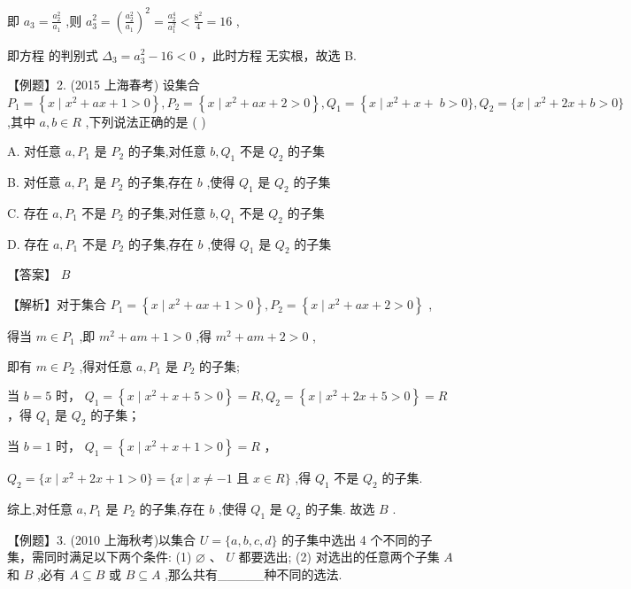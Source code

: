\documentclass[10pt]{article}
\newcommand*\circled[1]{\tikz[baseline=(char.base)]{\node[shape=circle,draw,inner sep=1.5pt] (char) {\small #1};}}
\begin{document}
即 \({a}_{3} = \frac{{a}_{2}^{2}}{{a}_{1}}\) ,则 \({a}_{3}^{2} = {\left( \frac{{a}_{2}^{2}}{{a}_{1}}\right) }^{2} = \frac{{a}_{2}^{4}}{{a}_{1}^{2}} < \frac{{8}^{2}}{4} = {16}\) ,

即方程 \circled{3} 的判别式 \({\Delta }_{3} = {a}_{3}^{2} - {16} < 0\) ，此时方程 \circled{3} 无实根，故选 B.

【例题】2. (2015 上海春考) 设集合 \({P}_{1} = \left\{  {x \mid  {x}^{2} + {ax} + 1 > 0}\right\}  ,{P}_{2} = \left\{  {x \mid  {x}^{2} + {ax} + 2 > 0}\right\}  ,{Q}_{1} = \left\{  {x \mid  {x}^{2} + x + }\right. \; b > 0\} ,{Q}_{2} = \{ x \mid  {x}^{2} + {2x} + b > 0\}\) ,其中 \(a,b \in  R\) ,下列说法正确的是 ( )

A. 对任意 \(a,{P}_{1}\) 是 \({P}_{2}\) 的子集,对任意 \(b,{Q}_{1}\) 不是 \({Q}_{2}\) 的子集

B. 对任意 \(a,{P}_{1}\) 是 \({P}_{2}\) 的子集,存在 \(b\) ,使得 \({Q}_{1}\) 是 \({Q}_{2}\) 的子集

C. 存在 \(a,{P}_{1}\) 不是 \({P}_{2}\) 的子集,对任意 \(b,{Q}_{1}\) 不是 \({Q}_{2}\) 的子集

D. 存在 \(a,{P}_{1}\) 不是 \({P}_{2}\) 的子集,存在 \(b\) ,使得 \({Q}_{1}\) 是 \({Q}_{2}\) 的子集

【答案】 \(B\)

【解析】对于集合 \({P}_{1} = \left\{  {x \mid  {x}^{2} + {ax} + 1 > 0}\right\}  ,{P}_{2} = \left\{  {x \mid  {x}^{2} + {ax} + 2 > 0}\right\}\) ,

得当 \(m \in  {P}_{1}\) ,即 \({m}^{2} + {am} + 1 > 0\) ,得 \({m}^{2} + {am} + 2 > 0\) ,

即有 \(m \in  {P}_{2}\) ,得对任意 \(a,{P}_{1}\) 是 \({P}_{2}\) 的子集;

当 \(b = 5\) 时， \({Q}_{1} = \left\{  {x \mid  {x}^{2} + x + 5 > 0}\right\}   = R,{Q}_{2} = \left\{  {x \mid  {x}^{2} + {2x} + 5 > 0}\right\}   = R\) ，得 \({Q}_{1}\) 是 \({Q}_{2}\) 的子集；

当 \(b = 1\) 时， \({Q}_{1} = \left\{  {x \mid  {x}^{2} + x + 1 > 0}\right\}   = R\) ，

\({Q}_{2} = \{ x \mid  {x}^{2} + {2x} + 1 > 0\}  = \{ x \mid  x \neq   - 1\) 且 \(x \in  R\}\) ,得 \({Q}_{1}\) 不是 \({Q}_{2}\) 的子集.

综上,对任意 \(a,{P}_{1}\) 是 \({P}_{2}\) 的子集,存在 \(b\) ,使得 \({Q}_{1}\) 是 \({Q}_{2}\) 的子集. 故选 \(B\) .

【例题】3. (2010 上海秋考)以集合 \(U = \{ a,b,c,d\}\) 的子集中选出 4 个不同的子集，需同时满足以下两个条件: (1) \(\varnothing \text{ 、 }U\) 都要选出; (2) 对选出的任意两个子集 \(A\) 和 \(B\) ,必有 \(A \subseteq  B\) 或 \(B \subseteq  A\) ,那么共有\_\_\_\_\_种不同的选法.
\end{document}
